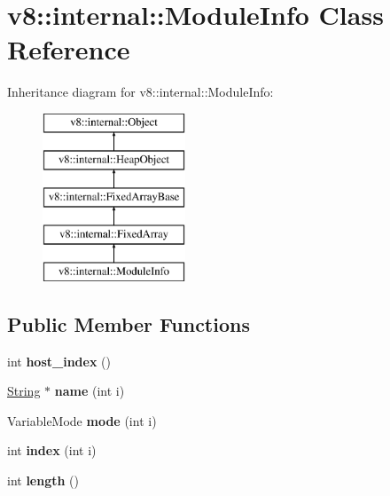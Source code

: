\hypertarget{classv8_1_1internal_1_1_module_info}{}\section{v8\+:\+:internal\+:\+:Module\+Info Class Reference}
\label{classv8_1_1internal_1_1_module_info}
Inheritance diagram for v8\+:\+:internal\+:\+:Module\+Info\+:\begin{figure}[H]
\begin{center}
\leavevmode
\includegraphics[height=5.000000cm]{classv8_1_1internal_1_1_module_info}
\end{center}
\end{figure}
\subsection*{Public Member Functions}
\begin{DoxyCompactItemize}
\item 
int {\bfseries host\+\_\+index} ()\hypertarget{classv8_1_1internal_1_1_module_info_ada43ca59c5dc2ac2f2d7a805a70f03f4}{}\label{classv8_1_1internal_1_1_module_info_ada43ca59c5dc2ac2f2d7a805a70f03f4}

\item 
\hyperlink{classv8_1_1internal_1_1_string}{String} $\ast$ {\bfseries name} (int i)\hypertarget{classv8_1_1internal_1_1_module_info_a829580890fe27d4d2a44573b12208818}{}\label{classv8_1_1internal_1_1_module_info_a829580890fe27d4d2a44573b12208818}

\item 
Variable\+Mode {\bfseries mode} (int i)\hypertarget{classv8_1_1internal_1_1_module_info_a2e61a7fffb0c58459ea532c6874755b2}{}\label{classv8_1_1internal_1_1_module_info_a2e61a7fffb0c58459ea532c6874755b2}

\item 
int {\bfseries index} (int i)\hypertarget{classv8_1_1internal_1_1_module_info_a8e813fd220f17c75e75d64ac236b92d6}{}\label{classv8_1_1internal_1_1_module_info_a8e813fd220f17c75e75d64ac236b92d6}

\item 
int {\bfseries length} ()\hypertarget{classv8_1_1internal_1_1_module_info_af99fe341ccd935813fd5f669c6ff2b3e}{}\label{classv8_1_1internal_1_1_module_info_af99fe341ccd935813fd5f669c6ff2b3e}

\end{DoxyCompactItemize}
